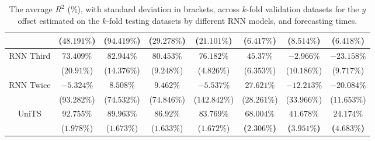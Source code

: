 \begin{table}[!ht]
{\begin{tabular}{|c|c|c|c|c|c|c|c|}
			 & ($48.191\%$) & ($94.419\%$) & ($29.278\%$) & ($21.101\%$) & ($6.417\%$) & ($8.514\%$) & ($6.418\%$) \\ \hline
			\multirow{2}{*}{RNN Third} & $73.409\%$ & $82.944\%$ & $80.453\%$ & $76.182\%$ & $45.37\%$ & $-2.966\%$ & $-23.158\%$ \\
			 & ($20.91\%$) & ($14.376\%$) & ($9.248\%$) & ($4.826\%$) & ($6.353\%$) & ($10.186\%$) & ($9.717\%$) \\ \hline
			\multirow{2}{*}{RNN Twice} & $-5.324\%$ & $8.508\%$ & $9.462\%$ & $-5.537\%$ & $27.621\%$ & $-12.213\%$ & $-20.084\%$ \\
			 & ($93.282\%$) & ($74.532\%$) & ($74.846\%$) & ($142.842\%$) & ($28.261\%$) & ($33.966\%$) & ($11.653\%$) \\ \hline
			\multirow{2}{*}{UniTS} & $92.755\%$ & $89.963\%$ & $86.92\%$ & $83.769\%$ & $\mathbf{68.004\%}$ & $\mathbf{41.678\%}$ & $\mathbf{24.174\%}$ \\
			 & ($1.978\%$) & ($1.673\%$) & ($1.633\%$) & ($1.672\%$) & \textbf{(}$\mathbf{2.306\%}$\textbf{)} & \textbf{(}$\mathbf{3.951\%}$\textbf{)} & \textbf{(}$\mathbf{4.683\%}$\textbf{)} \\ \hline
		\end{tabular}
	}
	\caption{The average $R^{2}$ (\%), with standard deviation in brackets, across $k$-fold validation datasets for the $y$ offset estimated on the $k$-fold testing datasets by different RNN models, and forecasting times.}
	\label{tab:all_latitude_no_abs_R2}
\end{table}

